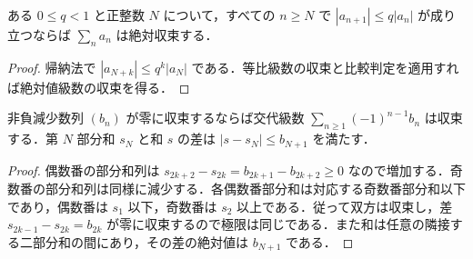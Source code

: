 \begin{prop}[比による絶対収束判定]
ある $0\leq q<1$ と正整数 $N$ について，すべての $n\geq N$ で $|a_{n+1}|\leq q|a_n|$ が成り立つならば $\sum_n a_n$ は絶対収束する．
\end{prop}
\begin{proof}
帰納法で $|a_{N+k}|\leq q^k|a_N|$ である．等比級数の収束と比較判定を適用すれば絶対値級数の収束を得る．
\end{proof}
\begin{prop}[交代級数の収束]
非負減少数列 $(b_n)$ が零に収束するならば交代級数 $\sum_{n\geq1}(-1)^{n-1}b_n$ は収束する．第 $N$ 部分和 $s_N$ と和 $s$ の差は $|s-s_N|\leq b_{N+1}$ を満たす．
\end{prop}
\begin{proof}
偶数番の部分和列は $s_{2k+2}-s_{2k}=b_{2k+1}-b_{2k+2}\geq0$ なので増加する．奇数番の部分和列は同様に減少する．各偶数番部分和は対応する奇数番部分和以下であり，偶数番は $s_1$ 以下，奇数番は $s_2$ 以上である．従って双方は収束し，差 $s_{2k-1}-s_{2k}=b_{2k}$ が零に収束するので極限は同じである．また和は任意の隣接する二部分和の間にあり，その差の絶対値は $b_{N+1}$ である．
\end{proof}
